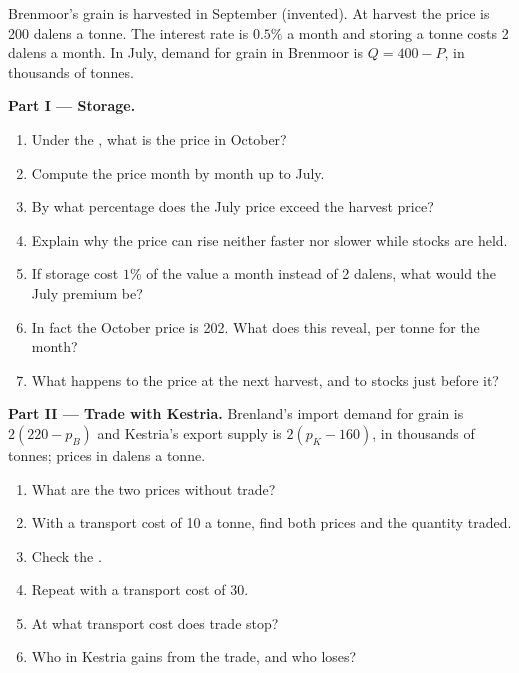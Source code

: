\begin{problem}\label{pb:b1:price-theory-at-work:store}
Brenmoor's grain is harvested in September (invented). At harvest the
price is 200 dalens a tonne. The interest rate is $0.5\%$ a month and storing a
tonne costs 2 dalens a month. In July, demand for grain in Brenmoor is
$Q = 400 - P$, in thousands of tonnes.

\medskip\noindent\textbf{Part I --- Storage.}
\begin{enumerate}
  \item Under the , what is the price in October?
  \item Compute the price month by month up to July.
  \item By what percentage does the July price exceed the harvest price?
  \item Explain why the price can rise neither faster nor slower while stocks are held.
  \item If storage cost $1\%$ of the value a month instead of 2 dalens, what would the July premium be?
  \item In fact the October price is 202. What  does this reveal, per tonne for the month?
  \item What happens to the price at the next harvest, and to stocks just before it?
\end{enumerate}

\medskip\noindent\textbf{Part II --- Trade with Kestria.} Brenland's import
demand for grain is $2(220 - p_B)$ and Kestria's export supply is
$2(p_K - 160)$, in thousands of tonnes; prices in dalens a tonne.
\begin{enumerate}[resume]
  \item What are the two prices without trade?
  \item With a transport cost of 10 a tonne, find both prices and the quantity traded.
  \item Check the .
  \item Repeat with a transport cost of 30.
  \item At what transport cost does trade stop?
  \item Who in Kestria gains from the trade, and who loses?
\end{enumerate}


\end{problem}
